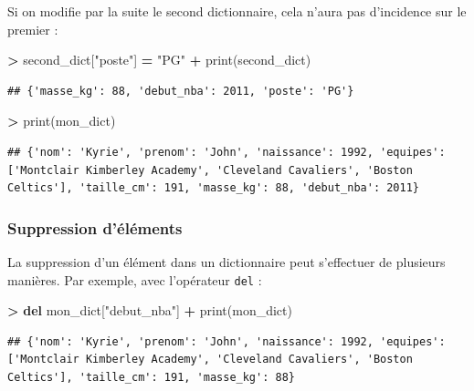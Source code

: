 \documentclass[12pt,]{book}
\newenvironment{Shaded}{\begin{snugshade}}{\end{snugshade}}
\newcommand{\KeywordTok}[1]{\textcolor[rgb]{0.13,0.29,0.53}{\textbf{#1}}}
\newcommand{\StringTok}[1]{\textcolor[rgb]{0.31,0.60,0.02}{#1}}
\newcommand{\OperatorTok}[1]{\textcolor[rgb]{0.81,0.36,0.00}{\textbf{#1}}}
\newcommand{\BuiltInTok}[1]{#1}
\newcommand{\NormalTok}[1]{#1}
\numberwithin{equation}{section}
\numberwithin{countremarque}{section}
\begin{document}
Si on modifie par la suite le second dictionnaire, cela n'aura pas
d'incidence sur le premier :

\begin{Shaded}
\begin{Highlighting}[]
\OperatorTok{>}\NormalTok{ second_dict[}\StringTok{"poste"}\NormalTok{] }\OperatorTok{=} \StringTok{"PG"}
\OperatorTok{+} \BuiltInTok{print}\NormalTok{(second_dict)}
\end{Highlighting}
\end{Shaded}

\begin{lstlisting}
## {'masse_kg': 88, 'debut_nba': 2011, 'poste': 'PG'}
\end{lstlisting}

\begin{Shaded}
\begin{Highlighting}[]
\OperatorTok{>} \BuiltInTok{print}\NormalTok{(mon_dict)}
\end{Highlighting}
\end{Shaded}

\begin{lstlisting}
## {'nom': 'Kyrie', 'prenom': 'John', 'naissance': 1992, 'equipes': ['Montclair Kimberley Academy', 'Cleveland Cavaliers', 'Boston Celtics'], 'taille_cm': 191, 'masse_kg': 88, 'debut_nba': 2011}
\end{lstlisting}

\subsubsection{Suppression d'éléments}\label{suppression-delements-1}

La suppression d'un élément dans un dictionnaire peut s'effectuer de
plusieurs manières. Par exemple, avec l'opérateur \texttt{del} :

\begin{Shaded}
\begin{Highlighting}[]
\OperatorTok{>} \KeywordTok{del}\NormalTok{ mon_dict[}\StringTok{"debut_nba"}\NormalTok{]}
\OperatorTok{+} \BuiltInTok{print}\NormalTok{(mon_dict)}
\end{Highlighting}
\end{Shaded}

\begin{lstlisting}
## {'nom': 'Kyrie', 'prenom': 'John', 'naissance': 1992, 'equipes': ['Montclair Kimberley Academy', 'Cleveland Cavaliers', 'Boston Celtics'], 'taille_cm': 191, 'masse_kg': 88}
\end{lstlisting}
\end{document}
